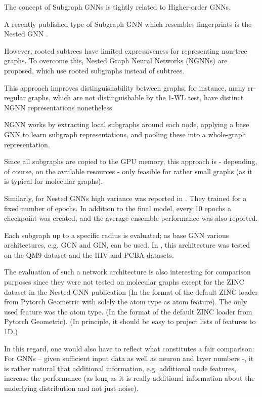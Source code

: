The concept of Subgraph GNNs is tightly related to Higher-order GNNs.

A recently published type of Subgraph GNN which resembles fingerprints is the Nested GNN \cite{Zhang.2021}. 

However, rooted subtrees have limited expressiveness for representing non-tree graphs. To overcome this, Nested Graph Neural Networks (NGNNs) are proposed, which use rooted subgraphs instead of subtrees.

This approach improves distinguishability between graphs; for instance, many rr-regular graphs, which are not distinguishable by the 1-WL test, have distinct NGNN representations nonetheless.

NGNN works by extracting local subgraphs around each node, applying a base GNN to learn subgraph representations, and pooling these into a whole-graph representation. 


Since all subgraphs are copied to the GPU memory, this approach is - depending, of course, on the available resources - only feasible for rather small graphs (as it is typical for molecular graphs).

Similarly, for Nested GNNs high variance was reported in \cite{Zhang.2021}. They trained for a fixed number of epochs. In addition to the final model, every 10 epochs a checkpoint was created, and the average ensemble performance was also reported.

Each subgraph up to a specific radius is evaluated; as base GNN various architectures, e.g. GCN and GIN, can be used.
In \cite{Zhang.2021}, this architecture was tested on the QM9 dataset and the HIV and PCBA datasets.


The evaluation of such a network architecture is also interesting for comparison purposes since they were not tested on molecular graphs except for the ZINC dataset in the Nested GNN publication (In the format of the default ZINC loader from Pytorch Geometric with solely the atom type as atom feature).
The only used feature was the atom type.
(In the format of the default ZINC loader from Pytorch Geometric). (In principle, it should be easy to project lists of features to 1D.)

In this regard, one would also have to reflect what constitutes a fair comparison: For GNNs – given sufficient input data as well as neuron and layer numbers -, it is rather natural that additional information, e.g. additional node features, increase the performance (as long as it is really additional information about the underlying distribution and not just noise).


